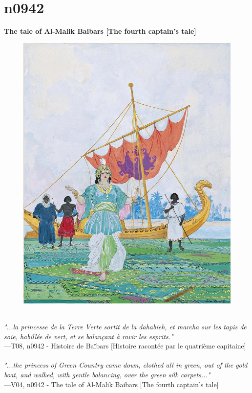 \documentclass[../Carre_nights.tex]{subfiles}
\begin{document}
\newpage

\section{n0942}
\textbf{\Large{The tale of Al-Malik Baibars [The fourth captain’s tale]}} \\

\begin{figure}[ht]
\centering
\includegraphics[height=\figsize]{illustrations/volume_8/T08, n0942 - Histoire de Baïbars [Histoire racontée par le quatrième capitaine].jpg}
\end{figure}

\textit{\\
"...la princesse de la Terre Verte sortit de la dahabieh, et marcha sur les tapis de soie, habillée de vert, et se balançant à ravir les esprits."} \\
—T08, n0942 - Histoire de Baïbars [Histoire racontée par le quatrième capitaine] \\~\\
\textit{"...the princess of Green Country came down, clothed all in green, out of the gold boat, and walked, with gentle balancing, over the green silk carpets..."} \\
—V04, n0942 - The tale of Al-Malik Baibars [The fourth captain’s tale]
\end{document}
